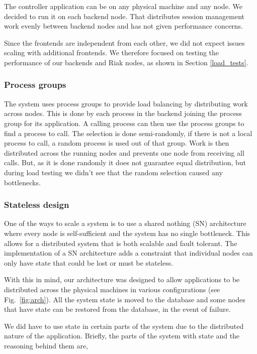 \documentclass[11pt,a4paper]{report}
\begin{document}
The controller application can be on any physical machine and any node. We
decided to run it on each backend node. That distributes session management work
evenly between backend nodes and has not given performance concerns.

Since the frontends are independent from each other, we did not expect issues
scaling with additional frontends. We therefore focused on testing the performance
of our backends and Riak nodes, as shown in Section \ref{load_tests}.

\subsubsection{Process groups}
\label{sec:process_groups}
The system uses process groups\cite{process_groups} to provide load balancing by
distributing work across nodes.
This is done by each process in the backend joining the process group for its
application. A calling process can then use the process groups to find a
process to call. The selection is done semi-randomly, if there is not a local
process to call, a random process is used out of that group.
Work is then distributed across the running nodes and prevents one node from
receiving all calls. But, as it is done randomly it does not guarantee equal
distribution, but during load testing we didn't see that the random selection
caused any bottlenecks.

\subsubsection{Stateless design}
\label{sec:stateless}
One of the ways to scale a system is to use a shared nothing (SN)
architecture \cite{sn_arch}
where every node is self-sufficient and the system has no single bottleneck.
This allows for a distributed system that is both scalable and fault tolerant.
The implementation of a SN architecture adds a constraint that individual
nodes can only have state that could be lost or must be stateless.

With this in mind, our architecture was designed to allow applications to
be distributed across the physical machines in various configurations
(see Fig.~\ref{fig:arch}). All the system state is moved to the database
and some nodes that have state can be restored from the database, in
the event of failure.

We did have to use state in certain parts of the system due to the
distributed nature of the application. Briefly, the parts of the system
with state and the reasoning behind them are,
\end{document}
